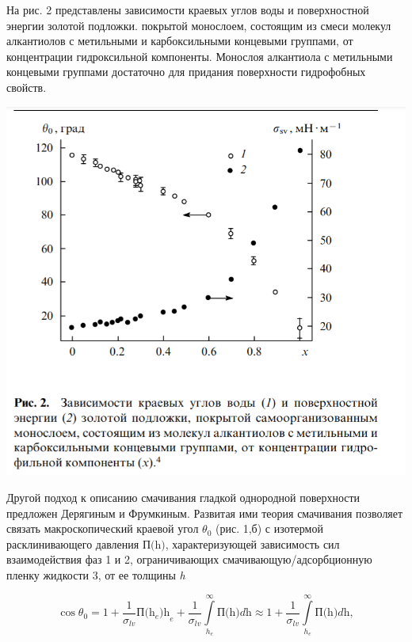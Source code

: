 \documentclass[11pt]{article}
\begin{document}
\vspace{0.5cm}

\indent На рис. 2 представлены зависимости краевых углов воды и поверхностной энергии золотой подложки. покрытой монослоем, состоящим из смеси молекул алкантиолов с метильными и карбоксильными концевыми группами, от концентрации гидроксильной компоненты. Монослоя алкантиола с метильными концевыми группами достаточно для придания поверхности гидрофобных свойств.

\vspace{0.5cm}

\includegraphics[scale=1]{vpv2.png}

\vspace{0.5cm}

\indent Другой подход к описанию смачивания гладкой однородной поверхности предложен Дерягиным и Фрумкиным. Развитая ими теория смачивания позволяет связать макроскопический краевой угол $\theta_0$ (рис. 1,б) с изотермой расклинивающего давления $\textit{П(h)}$, характеризующей зависимость сил взаимодействия фаз 1 и 2, ограничивающих смачивающую/адсорбционную пленку жидкости 3, от ее толщины \textit{h}

\begin{equation}
\cos \theta_0 = 1 + \frac{1}{\sigma_{lv}}\textit{П(} \textit{h}_e \textit{)h}_e + \frac{1}{\sigma_{lv}}\int\limits_{h_e}^{\infty}\textit{П(h)dh} \approx 1 + \frac{1}{\sigma_{lv}}\int\limits_{h_e}^{\infty}\textit{П(h)dh},
\end{equation}
\end{document}
